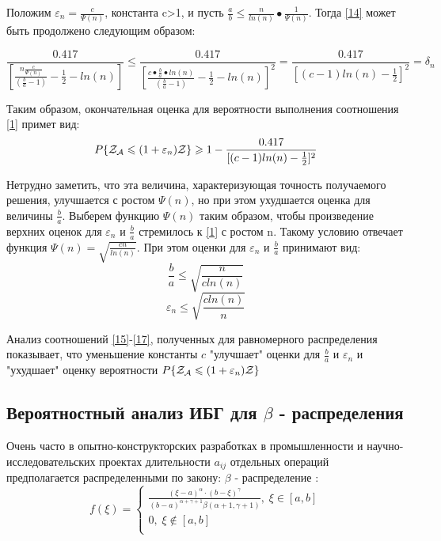 \documentclass[a4paper, 14pt]{extarticle}
\numberwithin{equation}{section}
\begin{document}
Положим $\varepsilon_n = \frac{c}{\Psi(n)}$, константа c>1, и пусть $\frac{a}{b} \leqslant \frac{n}{ln(n)} • \frac{1}{\Psi(n)}$. Тогда \eqref{14} может быть продолжено следующим образом:

\begin{equation*}
\frac{0.417}{[\frac{n\frac{c}{\Psi(n)}}{(\frac{b}{a}-1)}-\frac{1}{2}-ln(n)]} \leqslant \frac{0.417}{[\frac{c•\frac{b}{a}•ln(n)}{(\frac{b}{a}-1)}-\frac{1}{2}-ln(n)]^2} = \frac{0.417}{[(c-1)ln(n)-\frac{1}{2}]^2} = \delta_n
\end{equation*}

Таким образом, окончательная оценка для вероятности выполнения соотношения \eqref{1} примет вид:
\begin{equation}\label{15}
P \{ \text{$\mathcal{Z_{A}}$} \leqslant (1+\varepsilon_n)\mathcal{Z} \} \geqslant 1 - \frac{0.417}{[(c-1)ln(n)-\frac{1}{2}]^2}
\end{equation}

Нетрудно заметить, что эта величина, характеризующая точность получаемого решения, улучшается с ростом $\Psi(n)$, но при этом ухудшается оценка для величины $\frac{b}{a}$. Выберем функцию $\Psi(n)$ таким образом, чтобы произведение верхних оценок для $\varepsilon_n$ и $\frac{b}{a}$ стремилось к \eqref{1} с ростом n. Такому условию отвечает функция $\Psi(n) = \sqrt{\frac{cn}{ln(n)}}$. При этом оценки для $\varepsilon_n$ и $\frac{b}{a}$ принимают вид:
\begin{equation}\label{16}
\frac{b}{a} \leqslant \sqrt{\frac{n}{cln(n)}}
\end{equation}
\begin{equation}\label{17}
\varepsilon_n \leqslant \sqrt{\frac{cln(n)}{n}}
\end{equation}

Анализ соотношений \ref{15}-\ref{17}, полученных для равномерного распределения показывает, что уменьшение константы $c$ "улучшает" оценки для $\frac{b}{a}$ и $\varepsilon_n$ и "ухудшает" оценку вероятности $P \{ \text{$\mathcal{Z_{A}}$} \leqslant (1+\varepsilon_n)\mathcal{Z} \}$\\


\subsection{Вероятностный анализ ИБГ для $\beta$ - распределения}


 Очень часто в опытно-конструкторских разработках в промышленности и научно-исследовательских проектах длительности $a_{ij}$ отдельных операций предполагается распределенными по закону: $\beta$ - распределение :
\begin{equation*}
f(\xi) = 
\begin{cases}
   \frac{(\xi-a)^\alpha \cdot (b-\xi)^\gamma}{(b-a)^{\alpha+\gamma+1} \beta(\alpha+1, \gamma+1)},  \; \xi \in [a,b]\\
   0, \; \xi \notin [a,b] \\
 \end{cases}
\end{equation*}
\end{document}

